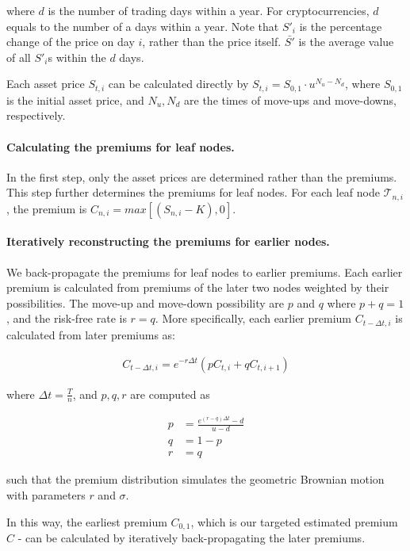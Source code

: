 where $d$ is the number of trading days within a year.
For cryptocurrencies, $d$ equals to the number of a days within a year.
Note that $S'_i$ is the percentage change of the price on day $i$, rather than the price itself.
$\bar{S'}$ is the average value of all $S'_i$s within the $d$ days. 

Each asset price $S_{t, i}$ can be calculated directly by $S_{t, i} = S_{0, 1} \cdot u^{N_u - N_d}$, where $S_{0, 1}$ is the initial asset price, and $N_u, N_d$ are the times of move-ups and move-downs, respectively.

\paragraph{Calculating the premiums for leaf nodes.}
In the first step, only the asset prices are determined rather than the premiums.
This step further determines the premiums for leaf nodes.
For each leaf node $\mathcal{T}_{n, i}$, the premium is $C_{n, i} = max[(S_{n, i} - K), 0]$.

\paragraph{Iteratively reconstructing the premiums for earlier nodes.}
We back-propagate the premiums for leaf nodes to earlier premiums.
Each earlier premium is calculated from premiums of the later two nodes weighted by their possibilities.
The move-up and move-down possibility are $p$ and $q$ where $p + q = 1$, and the risk-free rate is $r = q$.
More specifically, each earlier premium $C_{t - \Delta t, i}$ is calculated from later premiums as:

\begin{align}
C_{t - \Delta t, i} = e^{-r \Delta t} (p C_{t, i} + q C_{t, i+1})
\end{align}

where $\Delta t = \frac{T}{n}$, and $p, q, r$ are computed as

\begin{align} 
p &= \frac{e^{(r-q)\Delta t} - d}{u - d}\\
q &= 1 - p\\
r &= q
\end{align}

such that the premium distribution simulates the geometric Brownian motion~\cite{karatzas1998brownian} with parameters $r$ and $\sigma$.

In this way, the earliest premium $C_{0, 1}$, which is our targeted estimated premium $C$ - can be calculated by iteratively back-propagating the later premiums.

